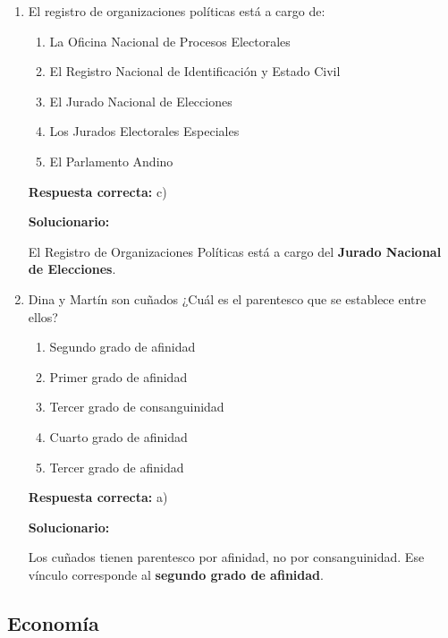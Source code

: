 \begin{enumerate}[resume]
	
	
	\item El registro de organizaciones políticas está a cargo de:
	\begin{enumerate}[label=\alph*)]
		\item La Oficina Nacional de Procesos Electorales
		\item El Registro Nacional de Identificación y Estado Civil
		\item El Jurado Nacional de Elecciones
		\item Los Jurados Electorales Especiales
		\item El Parlamento Andino
	\end{enumerate}
	\textbf{Respuesta correcta:} c)
	
	\vspace{2mm}
	\textbf{Solucionario:}
	
	El Registro de Organizaciones Políticas está a cargo del \textbf{Jurado Nacional de Elecciones}.
	
	\vspace{6mm}
	
	\item Dina y Martín son cuñados ¿Cuál es el parentesco que se establece entre ellos?
	\begin{enumerate}[label=\alph*)]
		\item Segundo grado de afinidad
		\item Primer grado de afinidad
		\item Tercer grado de consanguinidad
		\item Cuarto grado de afinidad
		\item Tercer grado de afinidad
	\end{enumerate}
	\textbf{Respuesta correcta:} a)
	
	\vspace{2mm}
	\textbf{Solucionario:}
	
	Los cuñados tienen parentesco por afinidad, no por consanguinidad.  
	Ese vínculo corresponde al \textbf{segundo grado de afinidad}.
	
	\vspace{6mm}
	
\end{enumerate}

\subsection*{Economía}


